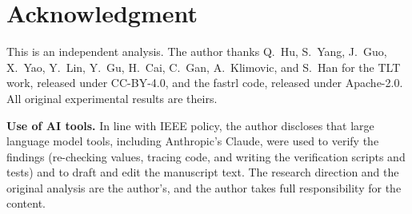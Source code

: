 \documentclass[conference]{IEEEtran}
\newcommand{\brkus}{\textunderscore\allowbreak}
\newcommand{\code}[1]{{\small\ttfamily\let\_\brkus\hyphenchar\font=-1 #1}}
\begin{document}
\section*{Acknowledgment}
This is an independent analysis. The author thanks Q.~Hu, S.~Yang, J.~Guo, X.~Yao, Y.~Lin, Y.~Gu, H.~Cai, C.~Gan, A.~Klimovic, and S.~Han for the TLT work, released under CC-BY-4.0, and the \code{fastrl} code, released under Apache-2.0. All original experimental results are theirs.

\textbf{Use of AI tools.} In line with IEEE policy, the author discloses that large language model tools, including Anthropic's Claude, were used to verify the findings (re-checking values, tracing code, and writing the verification scripts and tests) and to draft and edit the manuscript text. The research direction and the original analysis are the author's, and the author takes full responsibility for the content.



\end{document}
